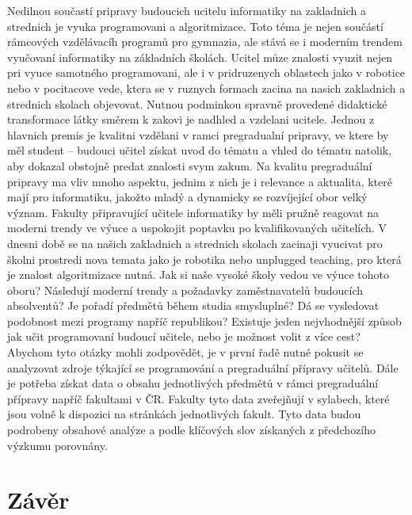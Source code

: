 \documentclass[FP,DP]{tulthesis}
\begin{document}
Nedilnou součastí pripravy budoucich ucitelu informatiky na zakladnich a strednich  je vyuka programovani a algoritmizace. Toto téma je nejen součástí rámcových vzdělávacíh programů pro gymnazia, ale stává se i moderním trendem vyučovaní informatiky na základních školách. Ucitel můze znalosti vyuzit nejen pri vyuce samotného programovani, ale i v pridruzenych oblastech jako v robotice nebo v pocitacove vede, ktera se v ruznych formach zacina na nasich zakladnich a strednich skolach objevovat. Nutnou podminkou spravně provedené didaktické transformace látky směrem  k zakovi je nadhled a vzdelani ucitele. Jednou z hlavnich premis je kvalitni vzdělani v ramci pregradualní pripravy, ve ktere by měl student – budouci učitel získat uvod do tématu a vhled do tématu natolik, aby dokazal obstojně predat znalosti svym zakum. Na kvalitu pregraduální pripravy ma vliv mnoho aspektu, jednim z nich je i relevance a aktualita, které mají pro informatiku, jakožto mladý a dynamicky se rozvíjející obor velký význam. Fakulty připravující učitele informatiky by měli pružně reagovat na moderni trendy ve výuce a uspokojit poptavku po kvalifikovaných učitelích.  V dnesni době se na našich zakladnich a strednich skolach zacinaji vyucivat pro školni prostredi nova temata jako je robotika nebo unplugged teaching, pro která je znalost algoritmizace nutná. Jak si naše vysoké školy vedou ve výuce tohoto oboru? Následují moderní trendy a požadavky zaměstnavatelů budoucích absolventů? Je pořadí předmětů během studia smysluplné? Dá se vysledovat podobnost mezi programy napříč republikou? Existuje  jeden nejvhodnější způsob jak učit programovaní budoucí učitele, nebo je možnost volit z více cest? Abychom tyto otázky mohli zodpovědět, je v první řadě nutné pokusit se analyzovat zdroje týkající se programování a pregraduální přípravy učitelů. Dále je potřeba získat data o obsahu jednotlivých předmětů v rámci pregraduální přípravy napříč fakultami v ČR. Fakulty tyto data zveřejňují v sylabech, které jsou volně k dispozici na stránkách jednotlivých fakult. Tyto data budou podrobeny obsahové analýze a podle klíčových slov získaných z předchozího výzkumu porovnány. 


\chapter{Závěr}
\textcolor{gray}{\Blindtext}
\end{document}
